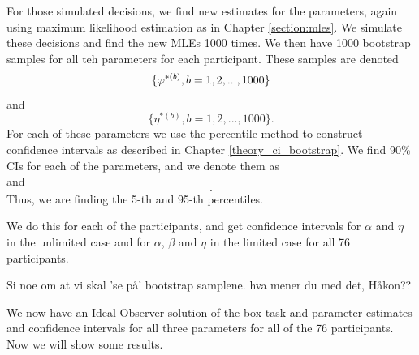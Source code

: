 For those simulated decisions, we find new estimates for the parameters, again using maximum likelihood estimation as in Chapter \ref{section:mles}. We simulate these decisions and find the new MLEs 1000 times. We then have 1000 bootstrap samples for all teh parameters for each participant. These samples are denoted
\begin{equation*}
    \{\varphi^{*(b)}, b=1,2,...,1000 \}
\end{equation*}
and 
\begin{equation*}
    \{\eta^{*(b)}, b=1,2,...,1000 \}.
\end{equation*}
For each of these parameters we use the percentile method to construct confidence intervals as described in Chapter \ref{theory_ci_bootstrap}. We find 90\% CIs for each of the parameters, and we denote them as
\begin{equation*}
    [\hat{\vp}^{*(5)}_{1000},\hat{\vp}^{*(95)}_{1000}]
\end{equation*}
and
\begin{equation*}
    [\hat{\eta}^{*(5)}_{1000},\hat{\eta}^{*(95)}_{1000}].
\end{equation*}
Thus, we are finding the 5-th and 95-th percentiles. 

We do this for each of the participants, and get confidence intervals for $\alpha$ and $\eta$ in the unlimited case and for $\alpha$, $\beta$ and $\eta$ in the limited case for all 76 participants. 

Si noe om at vi skal 'se på' bootstrap samplene. hva mener du med det, Håkon??

We now have an Ideal Observer solution of the box task and parameter estimates and confidence intervals for all three parameters for all of the 76 participants. Now we will show some results.